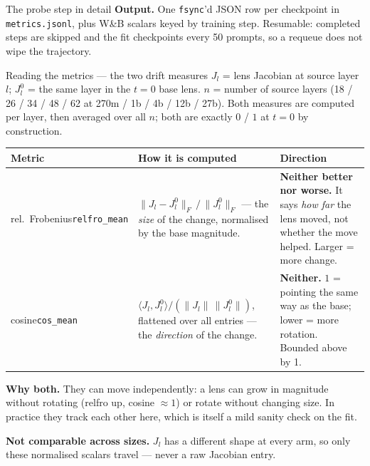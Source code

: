 \documentclass[aspectratio=169,10pt]{beamer}
\begin{document}
\begin{frame}{The probe step in detail}
  \vspace{0.1em}
  {\scriptsize \textbf{Output.} One \texttt{fsync}'d JSON row per checkpoint in
  \texttt{metrics.jsonl}, plus W\&B scalars keyed by training step. Resumable:
  completed steps are skipped and the fit checkpoints every 50 prompts, so a
  requeue does not wipe the trajectory.}
\end{frame}

\begin{frame}{Reading the metrics --- the two drift measures}
  \footnotesize
  $J_l$ = lens Jacobian at source layer $l$; $J_l^{0}$ = the same layer in the
  $t{=}0$ base lens. $n$ = number of source layers (18 / 26 / 34 / 48 / 62 at
  270m / 1b / 4b / 12b / 27b). Both measures are computed per layer, then averaged over
  all $n$; both are exactly $0$ / $1$ at $t{=}0$ by construction.

  \vspace{0.6em}
  \begin{tabular}{@{}p{}p{}p{}@{}}
    \toprule
    Metric & How it is computed & Direction \\
    \midrule
    rel.\ Frobenius\newline\texttt{relfro\_mean}
      & $\|J_l - J_l^{0}\|_F \,/\, \|J_l^{0}\|_F$ --- the \emph{size} of the
        change, normalised by the base magnitude.
      & \textbf{Neither better nor worse.} It says \emph{how far} the lens
        moved, not whether the move helped. Larger = more change. \\
    \addlinespace
    cosine\newline\texttt{cos\_mean}
      & $\langle J_l, J_l^{0}\rangle / (\|J_l\|\,\|J_l^{0}\|)$, flattened over
        all entries --- the \emph{direction} of the change.
      & \textbf{Neither.} $1$ = pointing the same way as the base; lower = more
        rotation. Bounded above by 1. \\
    \bottomrule
  \end{tabular}

  \vspace{0.8em}
  {\footnotesize \textbf{Why both.} They can move independently: a lens can grow
  in magnitude without rotating (relfro up, cosine ${\approx}1$) or rotate
  without changing size. In practice they track each other here, which is itself
  a mild sanity check on the fit.

  \smallskip
  \textbf{Not comparable across sizes.} $J_l$ has a different shape at every
  arm, so only these normalised scalars travel --- never a raw Jacobian entry.}
\end{frame}
\end{document}
